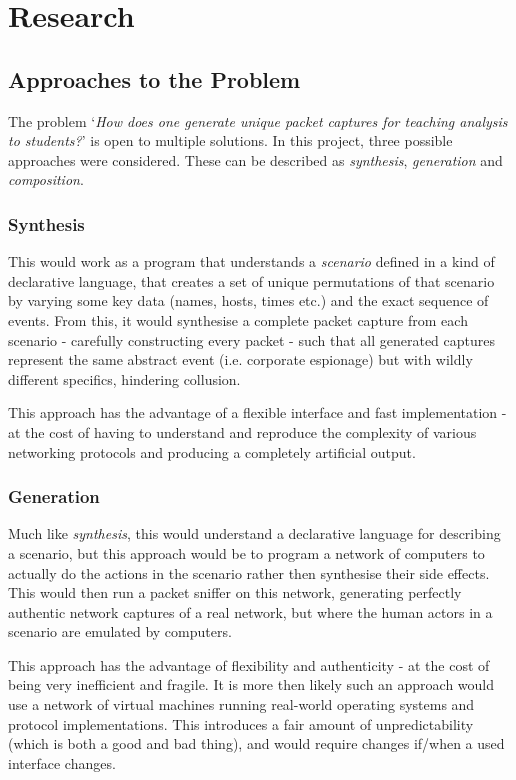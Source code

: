 \documentclass[10pt,a4paper,notitlepage]{report}
\begin{document}
\chapter{Research}
\section{Approaches to the Problem}
The problem `\emph{How does one generate unique packet captures for teaching analysis to students?}' is open to multiple solutions. In this project, three possible approaches were considered. These can be described as \emph{synthesis}, \emph{generation} and \emph{composition}.

\subsection{Synthesis}
This would work as a program that understands a \emph{scenario} defined in a kind of declarative language, that creates a set of unique permutations of that scenario by varying some key data (names, hosts, times etc.) and the exact sequence of events. From this, it would synthesise a complete packet capture from each scenario - carefully constructing every packet - such that all generated captures represent the same abstract event (i.e. corporate espionage) but with wildly different specifics, hindering collusion.

This approach has the advantage of a flexible interface and fast implementation - at the cost of having to understand and reproduce the complexity of various networking protocols and producing a completely artificial output.

\subsection{Generation}
Much like \emph{synthesis}, this would understand a declarative language for describing a scenario, but this approach would be to program a network of computers to actually do the actions in the scenario rather then synthesise their side effects. This would then run a packet sniffer on this network, generating perfectly authentic network captures of a real network, but where the human actors in a scenario are emulated by computers.

This approach has the advantage of flexibility and authenticity - at the cost of being very inefficient and fragile. It is more then likely such an approach would use a network of virtual machines running real-world operating systems and protocol implementations. This introduces a fair amount of unpredictability (which is both a good and bad thing), and would require changes if/when a used interface changes.
\end{document}
